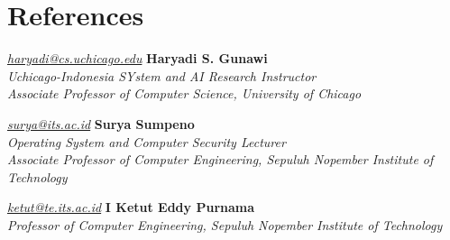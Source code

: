 \section{References}
\begin{twocolentry}{
    \textit{\href{mailto:haryadi@cs.uchicago.edu}{haryadi@cs.uchicago.edu}}
}
\textbf{Haryadi S. Gunawi}\\
\textit{Uchicago-Indonesia SYstem and AI Research Instructor\\
    Associate Professor of Computer Science, University of Chicago
}\\
\end{twocolentry}

\vspace{0.2 cm}

\begin{twocolentry}{
    \textit{\href{mailto:surya@its.ac.id}{surya@its.ac.id}}
}
\textbf{Surya Sumpeno}\\
\textit{Operating System and Computer Security Lecturer\\Associate Professor of Computer Engineering, Sepuluh Nopember Institute of Technology}\\
\end{twocolentry}

\vspace{0.2 cm}

\begin{twocolentry}{
    \textit{\href{mailto:ketut@te.its.ac.id}{ketut@te.its.ac.id}}
}
\textbf{I Ketut Eddy Purnama}\\
\textit{Professor of Computer Engineering, Sepuluh Nopember Institute of Technology}\\
\end{twocolentry}
